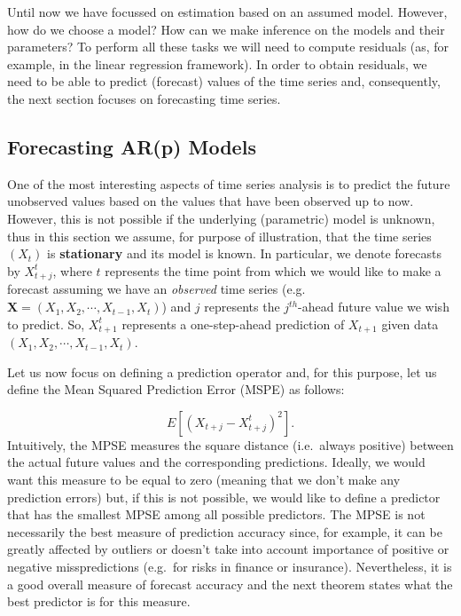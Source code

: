 \documentclass[]{book}
\theoremstyle{definition}
\theoremstyle{definition}
\theoremstyle{definition}
\theoremstyle{remark}
\begin{document}
Until now we have focussed on estimation based on an assumed model.
However, how do we choose a model? How can we make inference on the
models and their parameters? To perform all these tasks we will need to
compute residuals (as, for example, in the linear regression framework).
In order to obtain residuals, we need to be able to predict (forecast)
values of the time series and, consequently, the next section focuses on
forecasting time series.

\hypertarget{forecasting-arp-models}{%
\subsection{Forecasting AR(p) Models}\label{forecasting-arp-models}}

One of the most interesting aspects of time series analysis is to
predict the future unobserved values based on the values that have been
observed up to now. However, this is not possible if the underlying
(parametric) model is unknown, thus in this section we assume, for
purpose of illustration, that the time series \((X_t)\) is
\textbf{stationary} and its model is known. In particular, we denote
forecasts by \(X^{t}_{t+j}\), where \(t\) represents the time point from
which we would like to make a forecast assuming we have an
\emph{observed} time series (e.g.
\(\mathbf{X} = (X_{1}, X_{2}, \cdots , X_{t-1}, X_t)\)) and \(j\)
represents the \(j^{th}\)-ahead future value we wish to predict. So,
\(X^{t}_{t+1}\) represents a one-step-ahead prediction of \(X_{t+1}\)
given data \((X_{1}, X_{2}, \cdots, X_{t-1}, X_{t})\).

Let us now focus on defining a prediction operator and, for this
purpose, let us define the Mean Squared Prediction Error (MSPE) as
follows:

\[{E}[(X_{t+j} - X^{t}_{t+j})^2] .\] Intuitively, the MPSE measures the
square distance (i.e.~always positive) between the actual future values
and the corresponding predictions. Ideally, we would want this measure
to be equal to zero (meaning that we don't make any prediction errors)
but, if this is not possible, we would like to define a predictor that
has the smallest MPSE among all possible predictors. The MPSE is not
necessarily the best measure of prediction accuracy since, for example,
it can be greatly affected by outliers or doesn't take into account
importance of positive or negative misspredictions (e.g.~for risks in
finance or insurance). Nevertheless, it is a good overall measure of
forecast accuracy and the next theorem states what the best predictor is
for this measure.
\end{document}
